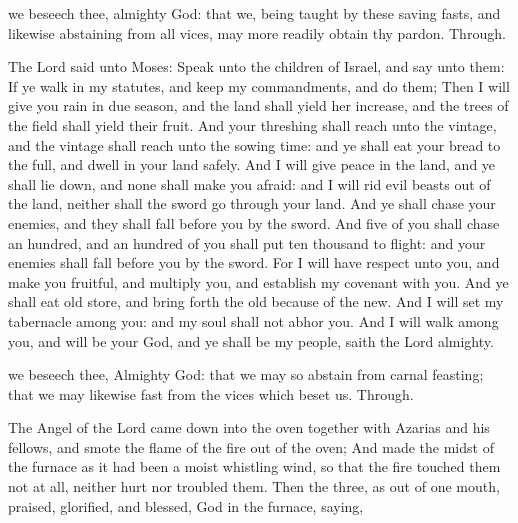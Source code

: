 \collect

\vspace{-0.1515\baselineskip}

{} we beseech thee, almighty God: that we, being taught by these saving fasts, and likewise abstaining from all vices, may more readily obtain thy pardon. Through.

 The Lord said unto Moses: Speak unto the children of Israel, and say unto them: If ye walk in my statutes, and keep my commandments, and do them; Then I will give you rain in due season, and the land shall yield her increase, and the trees of the field shall yield their fruit. And your threshing shall reach unto the vintage, and the vintage shall reach unto the sowing time: and ye shall eat your bread to the full, and dwell in your land safely. And I will give peace in the land, and ye shall lie down, and none shall make you afraid: and I will rid evil beasts out of the land, neither shall the sword go through your land. And ye shall chase your enemies, and they shall fall before you by the sword. And five of you shall chase an hundred, and an hundred of you shall put ten thousand to flight: and your enemies shall fall before you by the sword. For I will have respect unto you, and make you fruitful, and multiply you, and establish my covenant with you. And ye shall eat old store, and bring forth the old because of the new. And I will set my tabernacle among you: and my soul shall not abhor you. And I will walk among you, and will be your God, and ye shall be my people, saith the Lord almighty.


\collect
{}
{} we beseech thee, Almighty God: that we may so abstain from carnal feasting; that we may likewise fast from the vices which beset us. Through.

 The Angel of the Lord came down into the oven together with Azarias and his fellows, and smote the flame of the fire out of the oven; And made the midst of the furnace as it had been a moist whistling wind, so that the fire touched them not at all, neither hurt nor troubled them. Then the three, as out of one mouth, praised, glorified, and blessed, God in the furnace, saying,

